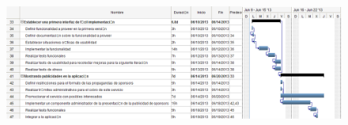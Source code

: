 \begin{landscape}
\begin{figure}[H]
\centering
\includegraphics[scale=\escaladefault]{graficos/gantt/subgantt3.png}
\caption{}
\end{figure}

\end{landscape}